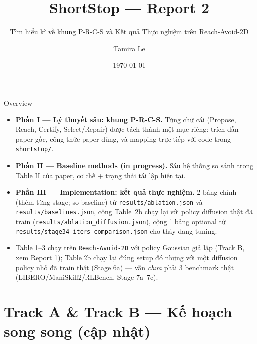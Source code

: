 \documentclass[aspectratio=169]{beamer}
\title{ShortStop --- Report 2}
\subtitle{Tìm hiểu kĩ về khung P-R-C-S và Kết quả Thực nghiệm trên Reach-Avoid-2D}
\author{Tamira Le}
\date{\today}
\begin{document}
\maketitle

\begin{frame}[t,shrink=8]{Overview}
\begin{itemize}
    \item \textbf{Phần I --- Lý thuyết sâu: khung P-R-C-S.} Từng chữ cái (Propose, Reach, Certify, Select/Repair) được tách thành một mục riêng: trích dẫn paper gốc, công thức paper dùng, và mapping trực tiếp với code trong \texttt{shortstop/}.
    \item \textbf{Phần II --- Baseline methods (in progress).} Sáu hệ thống so sánh trong Table II của paper, cơ chế + trạng thái tái lập hiện tại.
    \item \textbf{Phần III --- Implementation: kết quả thực nghiệm.} 2 bảng chính (thêm từng stage; so baseline) từ \texttt{results/ablation.json} và \texttt{results/baselines.json}, cộng Table~2b chạy lại với policy diffusion thật đã train (\texttt{results/ablation\_diffusion.json}), cộng 1 bảng optional từ \texttt{results/stage34\_iters\_comparison.json} cho thấy đang tuning.
    \item Table 1--3 chạy trên \texttt{Reach-Avoid-2D} với policy Gaussian giả lập (Track B, xem Report 1); Table 2b chạy lại đúng setup đó nhưng với một diffusion policy nhỏ đã train thật (Stage 6a) --- vẫn \emph{chưa} phải 3 benchmark thật (LIBERO/ManiSkill2/RLBench, Stage 7a--7c).
\end{itemize}
\end{frame}

\section{Track A \& Track B --- Kế hoạch song song (cập nhật)}
\end{document}
